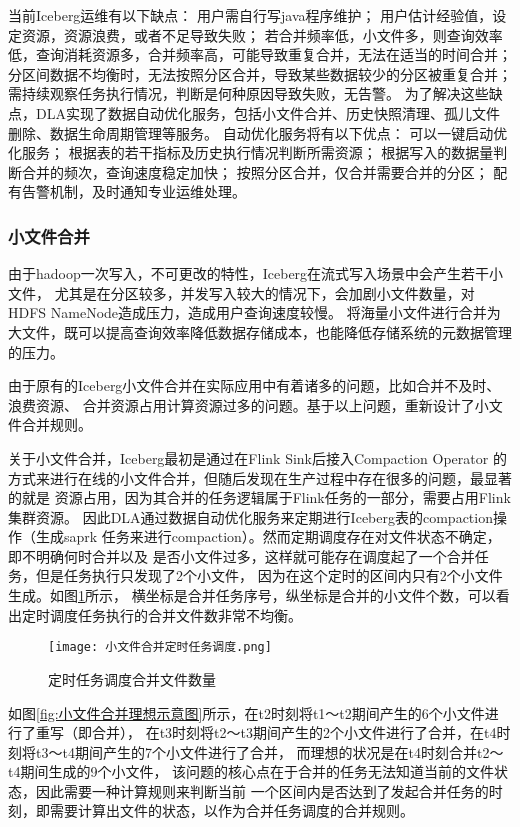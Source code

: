 当前Iceberg运维有以下缺点：
用户需自行写java程序维护；
用户估计经验值，设定资源，资源浪费，或者不足导致失败；
若合并频率低，小文件多，则查询效率低，查询消耗资源多，合并频率高，可能导致重复合并，无法在适当的时间合并；
分区间数据不均衡时，无法按照分区合并，导致某些数据较少的分区被重复合并；
需持续观察任务执行情况，判断是何种原因导致失败，无告警。
为了解决这些缺点，DLA实现了数据自动优化服务，包括小文件合并、历史快照清理、孤儿文件删除、数据生命周期管理等服务。
自动优化服务将有以下优点：
可以一键启动优化服务；
根据表的若干指标及历史执行情况判断所需资源；
根据写入的数据量判断合并的频次，查询速度稳定加快；
按照分区合并，仅合并需要合并的分区；
配有告警机制，及时通知专业运维处理。

\subsubsection{小文件合并}

由于hadoop一次写入，不可更改的特性，Iceberg在流式写入场景中会产生若干小文件，
尤其是在分区较多，并发写入较大的情况下，会加剧小文件数量，对HDFS NameNode造成压力，造成用户查询速度较慢\cite{35}。
将海量⼩⽂件进⾏合并为⼤⽂件，既可以提高查询效率降低数据存储成本，也能降低存储系统的元数据管理的压力。

由于原有的Iceberg小文件合并在实际应用中有着诸多的问题，比如合并不及时、浪费资源、
合并资源占用计算资源过多的问题。基于以上问题，重新设计了小文件合并规则。

关于小文件合并，Iceberg最初是通过在Flink Sink后接入Compaction Operator
的方式来进行在线的小文件合并，但随后发现在生产过程中存在很多的问题，最显著的就是
资源占用，因为其合并的任务逻辑属于Flink任务的一部分，需要占用Flink集群资源。
因此DLA通过数据自动优化服务来定期进行Iceberg表的compaction操作（生成saprk
任务来进行compaction）。然而定期调度存在对文件状态不确定，即不明确何时合并以及
是否小文件过多，这样就可能存在调度起了一个合并任务，但是任务执行只发现了2个小文件，
因为在这个定时的区间内只有2个小文件生成。如图\ref{fig:小文件合并定时任务调度}所示，
横坐标是合并任务序号，纵坐标是合并的小文件个数，可以看出定时调度任务执行的合并文件数非常不均衡。

\begin{figure}[H]
  \centering
  \texttt{[image: 小文件合并定时任务调度.png]}
  \caption{定时任务调度合并文件数量}
  \label{fig:小文件合并定时任务调度}
\end{figure}

如图\ref{fig:小文件合并理想示意图}所示，在t2时刻将t1～t2期间产生的6个小文件进行了重写（即合并），
在t3时刻将t2～t3期间产生的2个小文件进行了合并，在t4时刻将t3～t4期间产生的7个小文件进行了合并，
而理想的状况是在t4时刻合并t2～t4期间生成的9个小文件，
该问题的核心点在于合并的任务无法知道当前的文件状态，因此需要一种计算规则来判断当前
一个区间内是否达到了发起合并任务的时刻，即需要计算出文件的状态，以作为合并任务调度的合并规则。

